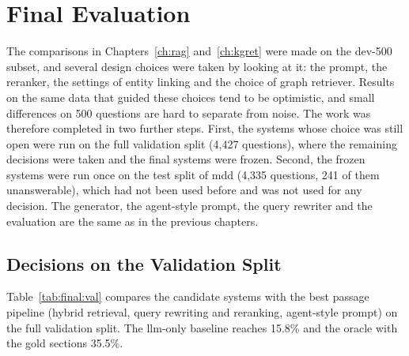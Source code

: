 
\chapter{Final Evaluation}\label{ch:final}

The comparisons in Chapters~\ref{ch:rag} and~\ref{ch:kgret} were made on the dev-500
subset, and several design choices were taken by looking at it: the prompt, the
reranker, the settings of entity linking and the choice of graph retriever. Results on
the same data that guided these choices tend to be optimistic, and small differences on
500 questions are hard to separate from noise. The work was therefore completed in two
further steps. First, the systems whose choice was still open were run on the full
validation split (4{,}427 questions), where the remaining decisions were taken and the
final systems were frozen. Second, the frozen systems were run once on the test split of
\gls{mdd} (4{,}335 questions, 241 of them unanswerable), which had not been used before
and was not used for any decision. The generator, the agent-style prompt, the query
rewriter and the evaluation are the same as in the previous chapters.


\section{Decisions on the Validation Split}\label{sec:final:val}

Table~\ref{tab:final:val} compares the candidate systems with the best passage pipeline
(hybrid retrieval, query rewriting and reranking, agent-style prompt) on the full
validation split. The \gls{llm}-only baseline reaches 15.8\% \fone{} and the oracle with
the gold sections 35.5\%.

